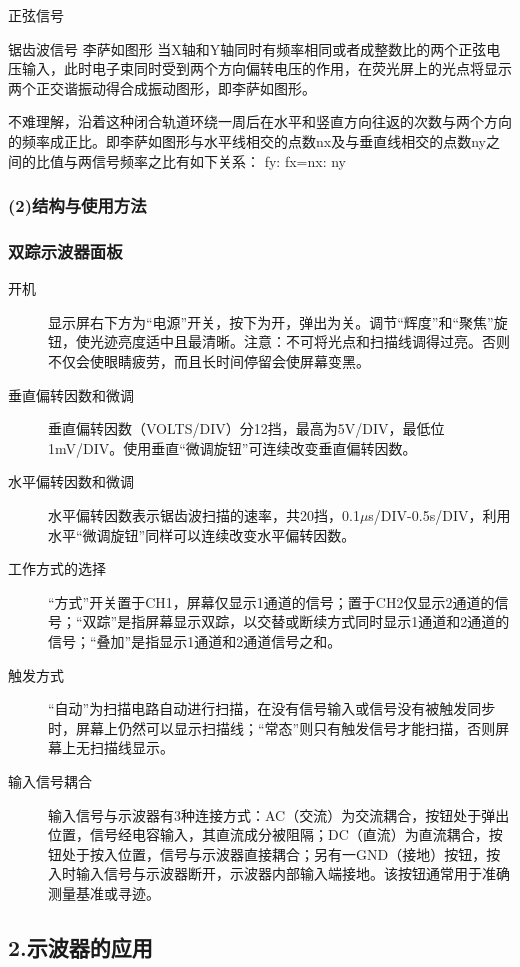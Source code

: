 \documentclass[11pt,a4paper,oneside]{article}
\begin{document}
正弦信号

锯齿波信号
李萨如图形
当X轴和Y轴同时有频率相同或者成整数比的两个正弦电压输入，此时电子束同时受到两个方向偏转电压的作用，在荧光屏上的光点将显示两个正交谐振动得合成振动图形，即李萨如图形。

不难理解，沿着这种闭合轨道环绕一周后在水平和竖直方向往返的次数与两个方向的频率成正比。即李萨如图形与水平线相交的点数nx及与垂直线相交的点数ny之间的比值与两信号频率之比有如下关系：
fy: fx=nx: ny


\subsubsection*{(2)结构与使用方法}
\subsubsection*{双踪示波器面板}

\begin{description}
\item[开机]
显示屏右下方为“电源”开关，按下为开，弹出为关。调节“辉度”和“聚焦”旋钮，使光迹亮度适中且最清晰。注意：不可将光点和扫描线调得过亮。否则不仅会使眼睛疲劳，而且长时间停留会使屏幕变黑。
\item[垂直偏转因数和微调]
垂直偏转因数（VOLTS/DIV）分12挡，最高为5V/DIV，最低位1mV/DIV。使用垂直“微调旋钮”可连续改变垂直偏转因数。
\item[水平偏转因数和微调]
水平偏转因数表示锯齿波扫描的速率，共20挡，0.1$\mu$s/DIV-0.5s/DIV，利用水平“微调旋钮”同样可以连续改变水平偏转因数。
\item[工作方式的选择]
“方式”开关置于CH1，屏幕仅显示1通道的信号；置于CH2仅显示2通道的信号；“双踪”是指屏幕显示双踪，以交替或断续方式同时显示1通道和2通道的信号；“叠加”是指显示1通道和2通道信号之和。
\item[触发方式]
“自动”为扫描电路自动进行扫描，在没有信号输入或信号没有被触发同步时，屏幕上仍然可以显示扫描线；“常态”则只有触发信号才能扫描，否则屏幕上无扫描线显示。
\item[输入信号耦合]
输入信号与示波器有3种连接方式：AC（交流）为交流耦合，按钮处于弹出位置，信号经电容输入，其直流成分被阻隔；DC（直流）为直流耦合，按钮处于按入位置，信号与示波器直接耦合；另有一GND（接地）按钮，按入时输入信号与示波器断开，示波器内部输入端接地。该按钮通常用于准确测量基准或寻迹。
\end{description}
\subsection*{2.示波器的应用}
\end{document}
